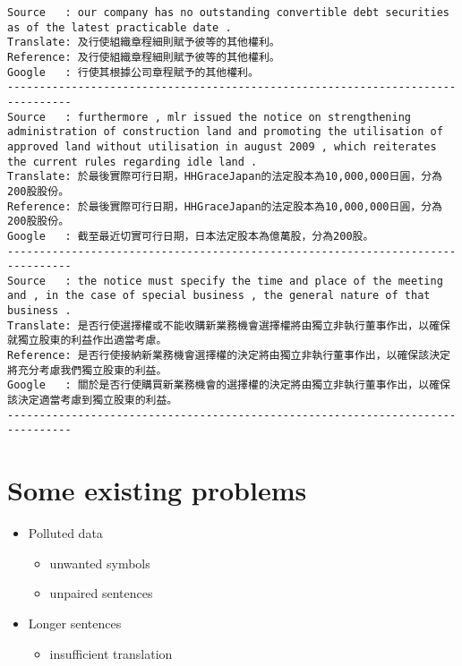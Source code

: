 \documentclass[11pt]{article}
\providecommand{\tightlist}{%
      \setlength{\itemsep}{0pt}\setlength{\parskip}{0pt}}
\begin{document}
    \begin{Verbatim}[commandchars=\\\{\}]
Source   : our company has no outstanding convertible debt securities as of the latest practicable date .
Translate: 及行使組織章程細則賦予彼等的其他權利。
Reference: 及行使組織章程細則賦予彼等的其他權利。
Google   : 行使其根據公司章程賦予的其他權利。
--------------------------------------------------------------------------------
Source   : furthermore , mlr issued the notice on strengthening administration of construction land and promoting the utilisation of approved land without utilisation in august 2009 , which reiterates the current rules regarding idle land .
Translate: 於最後實際可行日期，HHGraceJapan的法定股本為10,000,000日圓，分為200股股份。
Reference: 於最後實際可行日期，HHGraceJapan的法定股本為10,000,000日圓，分為200股股份。
Google   : 截至最近切實可行日期，日本法定股本為億萬股，分為200股。
--------------------------------------------------------------------------------
Source   : the notice must specify the time and place of the meeting and , in the case of special business , the general nature of that business .
Translate: 是否行使選擇權或不能收購新業務機會選擇權將由獨立非執行董事作出，以確保就獨立股東的利益作出適當考慮。
Reference: 是否行使接納新業務機會選擇權的決定將由獨立非執行董事作出，以確保該決定將充分考慮我們獨立股東的利益。
Google   : 關於是否行使購買新業務機會的選擇權的決定將由獨立非執行董事作出，以確保該決定適當考慮到獨立股東的利益。
--------------------------------------------------------------------------------

    \end{Verbatim}

    \section{Some existing problems}\label{some-existing-problems}

\begin{itemize}
\tightlist
\item
   Polluted data

  \begin{itemize}
  \tightlist
  \item
    unwanted symbols
  \item
    unpaired sentences
  \end{itemize}
\item
   Longer sentences

  \begin{itemize}
  \tightlist
  \item
    insufficient translation
  \end{itemize}
\end{itemize}
\end{document}
